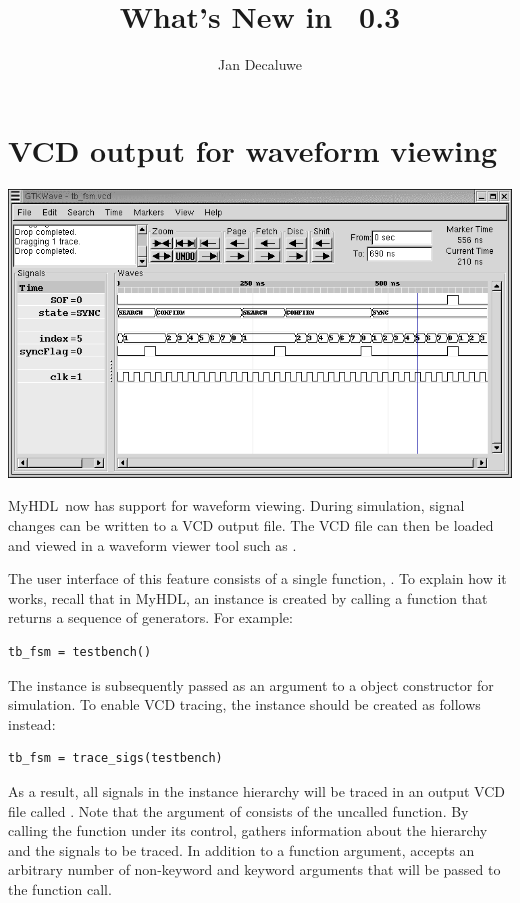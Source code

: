 \documentclass{howto}
\title{What's New in \myhdl\ 0.3}
\author{Jan Decaluwe}
\newcommand{\myhdl}{\protect \mbox{MyHDL}}
\begin{document}
\maketitle
\tableofcontents


\section{VCD output for waveform viewing\label{section-wave}}

\ifpdf
\includegraphics{tbfsm.png}
\fi

\myhdl\ now has support for waveform viewing. During simulation, signal
changes can be written to a VCD output file.  The VCD file can then be
loaded and viewed in a waveform viewer tool such as .

The user interface of this feature consists of a single function,
.  To explain how it works, recall that in
\myhdl{}, an instance is created by calling a function that returns a
sequence of generators. For example:

\begin{verbatim}
tb_fsm = testbench()
\end{verbatim}

The  instance is subsequently passed 
as an argument to a  object constructor
for simulation. To enable VCD tracing, the instance should 
be created as follows instead:

\begin{verbatim}
tb_fsm = trace_sigs(testbench)
\end{verbatim}

As a result, all signals in the instance hierarchy will be traced in
an output VCD file called . Note that the argument of
 consists of the uncalled function. By calling
the function under its control,  gathers
information about the hierarchy and the signals to be traced.  In
addition to a function argument,  accepts an
arbitrary number of non-keyword and keyword arguments that will be
passed to the function call.
\end{document}
